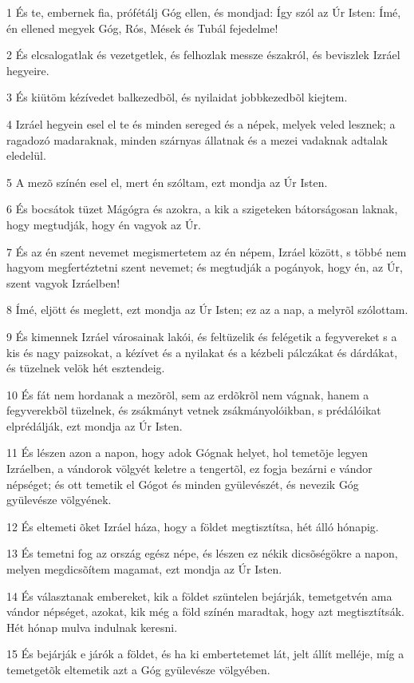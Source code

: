 \par 1 És te, embernek fia, prófétálj Góg ellen, és mondjad: Így szól az Úr Isten: Ímé, én ellened megyek Góg, Rós, Mések és Tubál fejedelme!
\par 2 És elcsalogatlak és vezetgetlek, és felhozlak messze északról, és beviszlek Izráel hegyeire.
\par 3 És kiütöm kézívedet balkezedbõl, és nyilaidat jobbkezedbõl kiejtem.
\par 4 Izráel hegyein esel el te és minden sereged és a népek, melyek veled lesznek; a ragadozó madaraknak, minden szárnyas állatnak és a mezei vadaknak adtalak eledelül.
\par 5 A mezõ színén esel el, mert én szóltam, ezt mondja az Úr Isten.
\par 6 És bocsátok tüzet Mágógra és azokra, a kik a szigeteken bátorságosan laknak, hogy megtudják, hogy én vagyok az Úr.
\par 7 És az én szent nevemet megismertetem az én népem, Izráel között, s többé nem hagyom megfertéztetni szent nevemet; és megtudják a pogányok, hogy én, az Úr, szent vagyok Izráelben!
\par 8 Ímé, eljött és meglett, ezt mondja az Úr Isten; ez az a nap, a melyrõl szólottam.
\par 9 És kimennek Izráel városainak lakói, és feltüzelik és felégetik a fegyvereket s a kis és nagy paizsokat, a kézívet és a nyilakat és a kézbeli pálczákat és dárdákat, és tüzelnek velök hét esztendeig.
\par 10 És fát nem hordanak a mezõrõl, sem az erdõkrõl nem vágnak, hanem a fegyverekbõl tüzelnek, és zsákmányt vetnek zsákmányolóikban, s prédálóikat elprédálják, ezt mondja az Úr Isten.
\par 11 És lészen azon a napon, hogy adok Gógnak helyet, hol temetõje legyen Izráelben, a vándorok völgyét keletre a tengertõl, ez fogja bezárni e vándor népséget; és ott temetik el Gógot és minden gyülevészét, és nevezik Góg gyülevésze völgyének.
\par 12 És eltemeti õket Izráel háza, hogy a földet megtisztítsa, hét álló hónapig.
\par 13 És temetni fog az ország egész népe, és lészen ez nékik dicsõségökre a napon, melyen megdicsõítem magamat, ezt mondja az Úr Isten.
\par 14 És választanak embereket, kik a földet szüntelen bejárják, temetgetvén ama vándor népséget, azokat, kik még a föld színén maradtak, hogy azt megtisztítsák. Hét hónap mulva indulnak keresni.
\par 15 És bejárják e járók a földet, és ha ki embertetemet lát, jelt állít melléje, míg a temetgetõk eltemetik azt a Góg gyülevésze völgyében.
